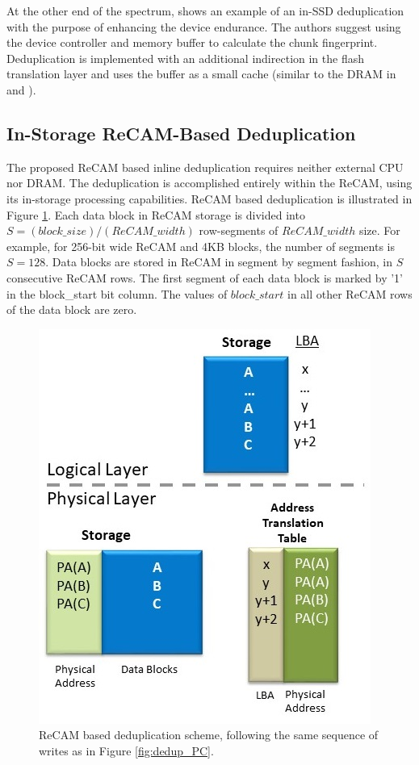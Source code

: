 \documentclass{superfri}
\begin{document}
	At the other end of the spectrum, \cite{chen2011caftl} shows an example of an in-SSD deduplication with the purpose of enhancing the device endurance. The authors suggest using the device controller and memory buffer to calculate the chunk fingerprint. Deduplication is implemented with an additional indirection in the flash translation layer and uses the buffer as a small cache (similar to the DRAM in \cite{debnath2010chunkstash} and \cite{zhu2008avoiding}). 
	
	
	\subsection{In-Storage ReCAM-Based Deduplication}
	
	
	The proposed ReCAM based inline deduplication requires neither external CPU nor DRAM. The deduplication is accomplished entirely within the ReCAM, using its in-storage processing capabilities. ReCAM based deduplication is illustrated in Figure \ref{fig:dedup_ReCAM}. Each data block in ReCAM storage is divided into $S=(block\_size)/(ReCAM\_width)$ row-segments of $ReCAM\_width$ size. For example, for 256-bit wide ReCAM and 4KB blocks, the number of segments is $S=128$. Data blocks are stored in ReCAM in segment by segment fashion, in $S$ consecutive ReCAM rows. The first segment of each data block is marked by '1' in the block\_start bit column. The values of $block\_start$ in all other ReCAM rows of the data block are zero. 
	
	\begin{figure}[ht!]
		\centerline{\includegraphics[scale=0.5]{Figures/dedup_ReCAM.jpg}}
		\caption{ReCAM based deduplication scheme, following the same sequence of writes as in Figure \ref{fig:dedup_PC}.}
		\label{fig:dedup_ReCAM}
	\end{figure}
	
\end{document}
